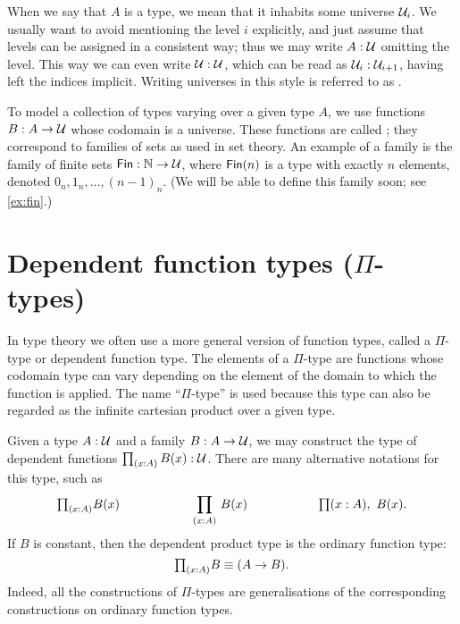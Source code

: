 
When we say that $A$ is a type, we mean that it inhabits some universe
$\mathcal{U}_i$. We usually want to avoid mentioning the level $i$ explicitly,
and just assume that levels can be assigned in a consistent way; thus we
may write $A:\mathcal{U}$ omitting the level. This way we can even write
$\mathcal{U}:\mathcal{U}$, which can be read as $\mathcal{U}_i:\mathcal{U}_{i+1}$, having left the
indices implicit.  Writing universes in this style is referred to as
.

To model a collection of types varying over a given type $A$, we use functions $B : A \to \mathcal{U}$  whose
codomain is a universe. These functions are called
; they correspond to families of sets as used in
set theory. An example of a family is the family of finite sets $\mathsf{Fin}
: \mathbb{N} \to \mathcal{U}$, where $\mathsf{Fin}(n)$ is a type with exactly $n$ elements, denoted $0_n,1_n,\dots,(n-1)_n$.
(We will be able to define this family soon; see \autoref{ex:fin}.)


\section{Dependent function types (\texorpdfstring{$\Pi$}{Π}-types)}
\label{sec:pi-types}

In type theory we often use a more general version of function
types, called a $\Pi$-type or dependent function type. The elements of
a $\Pi$-type are functions whose codomain type can vary depending on the
element of the domain to which the function is applied. The name ``$\Pi$-type''
is used because this type can also be regarded as the infinite cartesian
product over a given type.

Given a type $A:\mathcal{U}$ and a family $B:A \to \mathcal{U}$, we may construct
the type of dependent functions $\prd{x:A}B(x) : \UU$.
There are many alternative notations for this type, such as
\[ \tprd{x:A} B(x) \hspace{2cm} \dprd{x:A}B(x) \hspace{2cm} \lprd{x:A} B(x). \]
If $B$ is constant, then the dependent product type is the ordinary function type:
\[\tprd{x:A} B \jdeq (A \to B).\]
Indeed, all the constructions of $\Pi$-types are generalisations of the corresponding constructions on ordinary function types.

